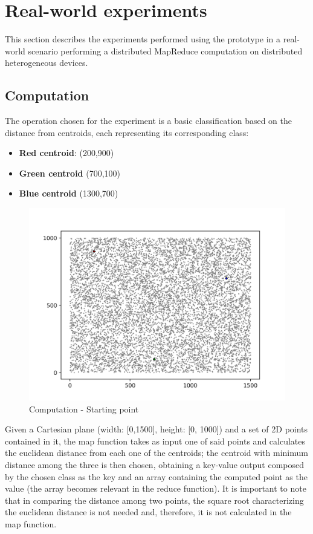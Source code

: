 \section{Real-world experiments}\label{real_world_experiments}
This section describes the experiments performed using the prototype in a real-world scenario performing a distributed MapReduce computation on distributed heterogeneous devices.

\subsection{Computation}
The operation chosen for the experiment is a basic classification based on the distance from centroids, each representing its corresponding class:
\begin{itemize}
    \item \textbf{Red centroid}: (200,900)
    \item \textbf{Green centroid} (700,100)
    \item \textbf{Blue centroid} (1300,700)
\end{itemize}

\begin{figure}[!ht]
    \centering
    \includegraphics[width=\linewidth]{document/chapters/chapter_7/images/computation_start.png}
    \caption{Computation - Starting point}
    \label{fig:computation_start}
\end{figure}

Given a Cartesian plane (width: [0,1500], height: [0, 1000]) and a set of 2D points contained in it, the map function takes as input one of said points and calculates the euclidean distance from each one of the centroids; the centroid with minimum distance among the three is then chosen, obtaining a key-value output composed by the chosen class as the key and an array containing the computed point as the value (the array becomes relevant in the reduce function). It is important to note that in comparing the distance among two points, the square root characterizing the euclidean distance is not needed and, therefore, it is not calculated in the map function.

